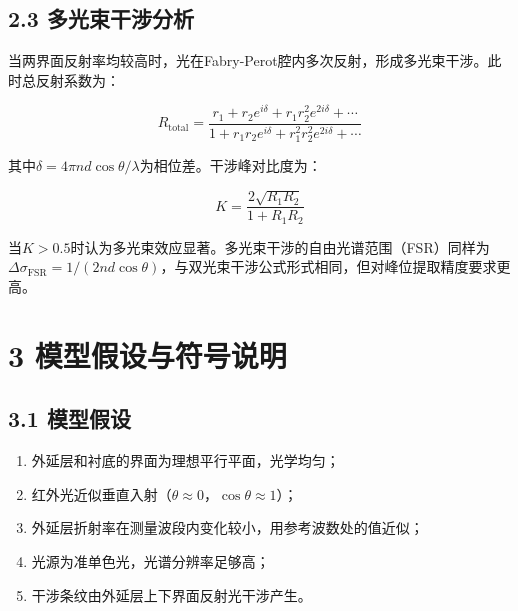\documentclass[withoutpreface]{cumcmthesis}
\begin{document}
\subsection{2.3 多光束干涉分析}
当两界面反射率均较高时，光在Fabry-Perot腔内多次反射，形成多光束干涉。此时总反射系数为：

\begin{equation}
R_{\text{total}} = \frac{r_1 + r_2 e^{i\delta} + r_1 r_2^2 e^{2i\delta} + \cdots}{1 + r_1 r_2 e^{i\delta} + r_1^2 r_2^2 e^{2i\delta} + \cdots}
\end{equation}

其中$\delta = 4\pi n d \cos\theta/\lambda$为相位差。干涉峰对比度为：

\begin{equation}
K = \frac{2\sqrt{R_1 R_2}}{1 + R_1 R_2}
\end{equation}

当$K > 0.5$时认为多光束效应显著。多光束干涉的自由光谱范围（FSR）同样为$\Delta\sigma_{\text{FSR}} = 1/(2nd\cos\theta)$，与双光束干涉公式形式相同，但对峰位提取精度要求更高。

\section{3 模型假设与符号说明}

\subsection{3.1 模型假设}
\begin{enumerate}
\item 外延层和衬底的界面为理想平行平面，光学均匀；
\item 红外光近似垂直入射（$\theta \approx 0$，$\cos\theta \approx 1$）；
\item 外延层折射率在测量波段内变化较小，用参考波数处的值近似；
\item 光源为准单色光，光谱分辨率足够高；
\item 干涉条纹由外延层上下界面反射光干涉产生。
\end{enumerate}
\end{document}
